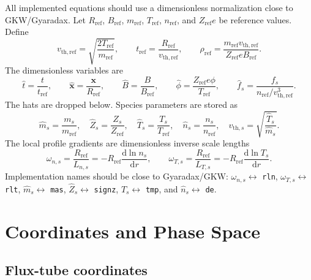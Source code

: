 \documentclass[11pt,a4paper]{article}
\newcommand{\dd}{\mathrm{d}}
\newcommand{\Lref}{R_{\mathrm{ref}}}
\newcommand{\vref}{v_{\mathrm{th,ref}}}
\newcommand{\rhoref}{\rho_{\mathrm{ref}}}
\begin{document}
All implemented equations should use a dimensionless normalization close to GKW/Gyaradax.  Let \(\Lref\), \(B_{\mathrm{ref}}\), \(m_{\mathrm{ref}}\), \(T_{\mathrm{ref}}\), \(n_{\mathrm{ref}}\), and \(Z_{\mathrm{ref}}e\) be reference values.  Define
\begin{equation}
  \vref = \sqrt{\frac{2T_{\mathrm{ref}}}{m_{\mathrm{ref}}}},
  \qquad
  t_{\mathrm{ref}} = \frac{\Lref}{\vref},
  \qquad
  \rhoref = \frac{m_{\mathrm{ref}}\vref}{Z_{\mathrm{ref}} e B_{\mathrm{ref}}}.
\end{equation}
The dimensionless variables are
\begin{equation}
  \hat t = \frac{t}{t_{\mathrm{ref}}},
  \qquad
  \hat{\bm x} = \frac{\bm x}{\Lref},
  \qquad
  \hat B = \frac{B}{B_{\mathrm{ref}}},
  \qquad
  \hat \phi = \frac{Z_{\mathrm{ref}} e \phi}{T_{\mathrm{ref}}},
  \qquad
  \hat f_s = \frac{f_s}{n_{\mathrm{ref}}/\vref^3}.
\end{equation}
The hats are dropped below.  Species parameters are stored as
\begin{equation}
  \hat m_s = \frac{m_s}{m_{\mathrm{ref}}},
  \quad
  \hat Z_s = \frac{Z_s}{Z_{\mathrm{ref}}},
  \quad
  \hat T_s = \frac{T_s}{T_{\mathrm{ref}}},
  \quad
  \hat n_s = \frac{n_s}{n_{\mathrm{ref}}},
  \quad
  v_{\mathrm{th},s} = \sqrt{\frac{\hat T_s}{\hat m_s}}.
\end{equation}
The local profile gradients are dimensionless inverse scale lengths
\begin{equation}
  \omega_{n,s} = \frac{\Lref}{L_{n,s}}
  = -\Lref \frac{\dd \ln n_s}{\dd r},
  \qquad
  \omega_{T,s} = \frac{\Lref}{L_{T,s}}
  = -\Lref \frac{\dd \ln T_s}{\dd r}.
  \label{eq:profile-gradients}
\end{equation}
Implementation names should be close to Gyaradax/GKW: \(\omega_{n,s}\leftrightarrow\) \texttt{rln}, \(\omega_{T,s}\leftrightarrow\) \texttt{rlt}, \(\hat m_s\leftrightarrow\) \texttt{mas}, \(\hat Z_s\leftrightarrow\) \texttt{signz}, \(\hat T_s\leftrightarrow\) \texttt{tmp}, and \(\hat n_s\leftrightarrow\) \texttt{de}.

\section{Coordinates and Phase Space}

\subsection{Flux-tube coordinates}
\end{document}
